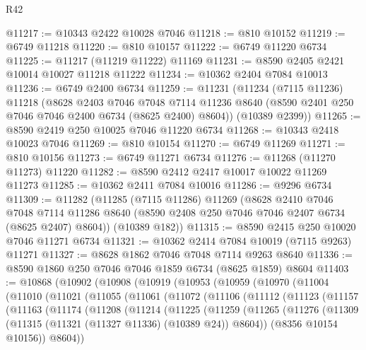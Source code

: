 \begin{lexlean}{R42}
\begin{coremodule}
{@11217 := @10343 @2422 @10028 @7046
@11218 := @810 @10152
@11219 := @6749 @11218
@11220 := @810 @10157
@11222 := @6749 @11220 @6734
@11225 := @11217 (@11219 @11222) @11169
@11231 := @8590 @2405 @2421 @10014 @10027 @11218 @11222
@11234 := @10362 @2404 @7084 @10013
@11236 := @6749 @2400 @6734
@11259 := @11231
    (@11234
      (@7115 @11236)
      @11218
      (@8628
        @2403
        @7046
        @7048
        @7114
        @11236
        @8640
        (@8590 @2401 @250 @7046 @7046 @2400 @6734 (@8625 @2400) @8604))
      (@10389 @2399))
@11265 := @8590 @2419 @250 @10025 @7046 @11220 @6734
@11268 := @10343 @2418 @10023 @7046
@11269 := @810 @10154
@11270 := @6749 @11269
@11271 := @810 @10156
@11273 := @6749 @11271 @6734
@11276 := @11268 (@11270 @11273) @11220
@11282 := @8590 @2412 @2417 @10017 @10022 @11269 @11273
@11285 := @10362 @2411 @7084 @10016
@11286 := @9296 @6734
@11309 := @11282
    (@11285
      (@7115 @11286)
      @11269
      (@8628
        @2410
        @7046
        @7048
        @7114
        @11286
        @8640
        (@8590 @2408 @250 @7046 @7046 @2407 @6734 (@8625 @2407) @8604))
      (@10389 @182))
@11315 := @8590 @2415 @250 @10020 @7046 @11271 @6734
@11321 := @10362 @2414 @7084 @10019 (@7115 @9263) @11271
@11327 := @8628 @1862 @7046 @7048 @7114 @9263 @8640
@11336 := @8590 @1860 @250 @7046 @7046 @1859 @6734 (@8625 @1859) @8604
@11403 := @10868
    (@10902
      (@10908
        (@10919
          (@10953
            (@10959
              (@10970
                (@11004
                  (@11010
                    (@11021
                      (@11055
                        (@11061
                          (@11072
                            (@11106
                              (@11112
                                (@11123
                                  (@11157
                                    (@11163
                                      (@11174
                                        (@11208
                                          (@11214
                                            (@11225
                                              (@11259
                                                (@11265
                                                  (@11276
                                                    (@11309
                                                      (@11315
                                                        (@11321 (@11327 @11336) (@10389 @24))
                                                        @8604))
                                                    (@8356 @10154 @10156))
                                                  @8604))
}
\end{coremodule}
\end{lexlean}
